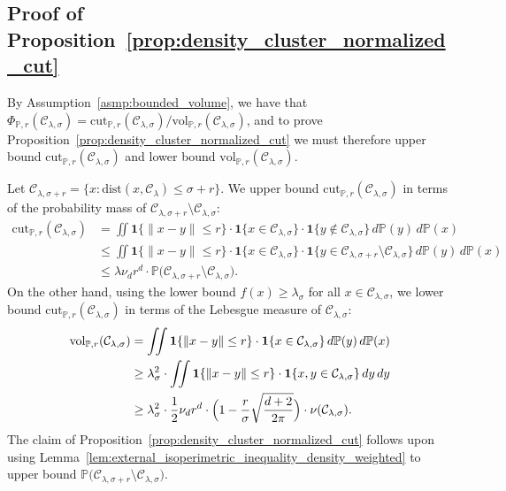 \documentclass{article}
\newcommand{\vol}{\mathrm{vol}}
\newcommand{\cut}{\mathrm{cut}}
\newcommand{\1}{\mathbf{1}}
\newcommand{\mc}[1]{\mathcal{#1}}
\newcommand{\Pbb}{\mathbb{P}}
\theoremstyle{definition}
\theoremstyle{remark}
\begin{document}
\subsection{Proof of Proposition~\ref{prop:density_cluster_normalized_cut}}
\label{subsec:density_cluster_ncut}
By Assumption~\ref{asmp:bounded_volume}, we have that $\Phi_{\Pbb,r}(\mc{C}_{\lambda,\sigma}) = \cut_{\Pbb,r}(\mc{C}_{\lambda,\sigma})/\vol_{\Pbb,r}(\mc{C}_{\lambda,\sigma})$, and to prove Proposition~\ref{prop:density_cluster_normalized_cut} we must therefore upper bound $\cut_{\Pbb,r}(\mc{C}_{\lambda,\sigma})$ and lower bound $\vol_{\Pbb,r}(\mc{C}_{\lambda,\sigma})$. 

Let $\mc{C}_{\lambda,\sigma + r} = \{x: \mathrm{dist}(x,\mc{C}_{\lambda}) \leq \sigma + r\}$. We upper bound $\cut_{\Pbb,r}(\mc{C}_{\lambda,\sigma})$ in terms of the probability mass of $\mc{C}_{\lambda,\sigma + r} \setminus \mc{C}_{\lambda,\sigma}$:
\begin{align*}
\cut_{\Pbb,r}(\mc{C}_{\lambda,\sigma}) & = \iint \1\{\|x - y\| \leq r \} \cdot \1\{x \in \mc{C}_{\lambda,\sigma}\} \cdot \1\{y \not\in \mc{C}_{\lambda,\sigma} \} \,d\Pbb(y) \,d\Pbb(x) \\
& \leq  \iint \1\{\|x - y\| \leq r \} \cdot \1\{x \in \mc{C}_{\lambda,\sigma}\} \cdot \1\{y \in \mc{C}_{\lambda,\sigma + r} \setminus \mc{C}_{\lambda,\sigma}  \} \,d\Pbb(y) \,d\Pbb(x) \\
& \leq \lambda \nu_d r^d \cdot \Pbb\bigl(\mc{C}_{\lambda,\sigma + r} \setminus \mc{C}_{\lambda,\sigma}\bigr).
\end{align*}
On the other hand, using the lower bound $f(x) \geq \lambda_{\sigma} $ for all $x \in \mc{C}_{\lambda,\sigma}$, we lower bound $\cut_{\Pbb,r}(\mc{C}_{\lambda,\sigma})$ in terms of the Lebesgue measure of $\mc{C}_{\lambda,\sigma}$:
\begin{align*}
\vol_{\Pbb,r}(\mc{C}_{\lambda,\sigma}) & = \iint \1\{\|x - y\| \leq r \} \cdot \1\{x \in \mc{C}_{\lambda,\sigma}\} \,d\Pbb(y) \,d\Pbb(x) \\
& \geq \lambda_{\sigma}^2 \cdot \iint \1\{\|x - y\| \leq r \} \cdot \1\{x,y \in \mc{C}_{\lambda,\sigma}\} \,dy \,dy \\
& \geq \lambda_{\sigma}^2 \cdot \frac{1}{2} \nu_d r^d \cdot \Bigl(1 - \frac{r}{\sigma} \sqrt{\frac{d + 2}{2\pi}}\Bigr) \cdot \nu(\mc{C}_{\lambda,\sigma}).
\end{align*}
The claim of Proposition~\ref{prop:density_cluster_normalized_cut} follows upon using Lemma~\ref{lem:external_isoperimetric_inequality_density_weighted} to upper bound $\Pbb\bigl(\mc{C}_{\lambda,\sigma + r} \setminus \mc{C}_{\lambda,\sigma}\bigr)$.
\end{document}
